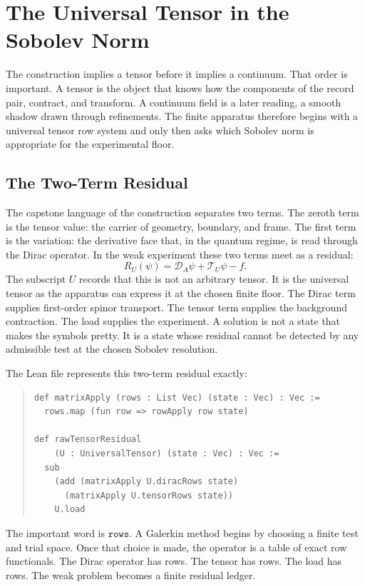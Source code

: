 \chapter[Universal Tensor in Sobolev Norm]{The Universal Tensor in the Sobolev Norm}
\label{chap:universal-tensor-sobolev}

The construction implies a tensor before it implies a continuum. That order is important. A tensor is the object
that knows how the components of the record pair, contract, and transform. A continuum field is a later reading,
a smooth shadow drawn through refinements. The finite apparatus therefore begins with a universal tensor row
system and only then asks which Sobolev norm is appropriate for the experimental floor.

\section{The Two-Term Residual}

The capstone language of the construction separates two terms. The zeroth term is the tensor value: the carrier
of geometry, boundary, and frame. The first term is the variation: the derivative face that, in the quantum
regime, is read through the Dirac operator. In the weak experiment these two terms meet as a residual:
\[
  R_U(\psi) =
  \mathcal D_A\psi + \mathcal T_U\psi - f .
\]
The subscript \(U\) records that this is not an arbitrary tensor. It is the universal tensor as the apparatus
can express it at the chosen finite floor. The Dirac term supplies first-order spinor transport. The tensor term
supplies the background contraction. The load supplies the experiment. A solution is not a state that makes the
symbols pretty. It is a state whose residual cannot be detected by any admissible test at the chosen Sobolev
resolution.

The Lean file represents this two-term residual exactly:

\begin{quote}\small
\begin{verbatim}
def matrixApply (rows : List Vec) (state : Vec) : Vec :=
  rows.map (fun row => rowApply row state)

def rawTensorResidual
    (U : UniversalTensor) (state : Vec) : Vec :=
  sub
    (add (matrixApply U.diracRows state)
      (matrixApply U.tensorRows state))
    U.load
\end{verbatim}
\end{quote}

The important word is \(\texttt{rows}\). A Galerkin method begins by choosing a finite test and trial space.
Once that choice is made, the operator is a table of exact row functionals. The Dirac operator has rows. The
tensor has rows. The load has rows. The weak problem becomes a finite residual ledger.

